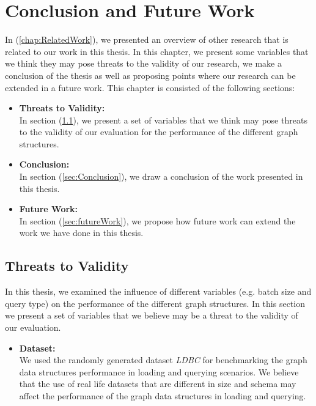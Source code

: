 {\chapter{Conclusion and Future Work}
\label{chap:Conclusion}

In (\ref{chap:RelatedWork}), we presented an overview of other research that is related to our work in this thesis. In this chapter, we present some variables that we think they may pose threats to the validity of our research, we make a conclusion of the thesis as well as proposing points where our research can be extended in a future work. This chapter is consisted of the following sections:

\begin{itemize}  

\item \textbf{Threats to Validity:}\\
In section (\ref{sec:threatsToValidity}), we present a set of variables that we think may pose threats to the validity of our evaluation for the performance of the different graph structures.

\item \textbf{Conclusion:}\\
In section (\ref{sec:Conclusion}), we draw a conclusion of the work presented in this thesis.

\item \textbf{Future Work:}\\
In section (\ref{sec:futureWork}), we propose how future work can extend the work we have done in this thesis.

\end{itemize}

\section{Threats to Validity}
\label{sec:threatsToValidity}

In this thesis, we examined the influence of different variables (e.g. batch size and query type) on the performance of the different graph structures. In this section we present a set of variables that we believe may be a threat to the validity of our evaluation.


\begin{itemize}  

\item \textbf{Dataset:}\\
We used the randomly generated dataset \textit{LDBC} for benchmarking the graph data structures performance in loading and querying scenarios. We believe that the use of real life datasets that are different in size and schema may affect the performance of the graph data structures in loading and querying.


\end{itemize}}
